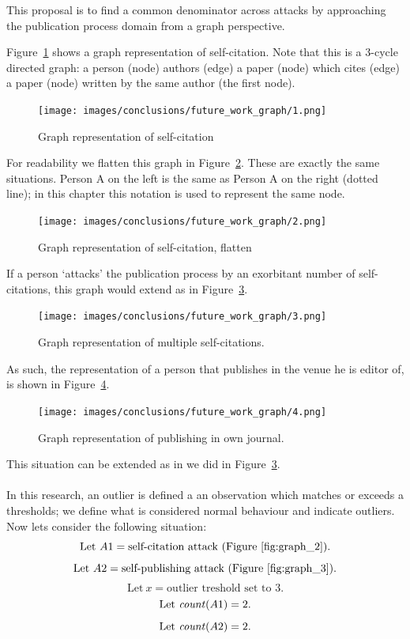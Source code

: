 \documentclass{ou-report}
\begin{document}
This proposal is to find a common denominator across attacks by approaching the 
publication process domain from a graph perspective.

Figure~\ref{fig:graph_1} shows a graph representation of self-citation.
Note that this is a 3-cycle directed graph: a person (node) authors (edge) a 
paper (node) which cites (edge) a paper (node) written by the same author (the 
first node).

\begin{figure}[H]
    \centering
    \texttt{[image: images/conclusions/future\_work\_graph/1.png]}
    \caption{Graph representation of self-citation}
    \label{fig:graph_1}
\end{figure}

For readability we flatten this graph in Figure~\ref{fig:graph_2}. These are 
exactly the same situations. Person A on the left is the same as Person A on
the right (dotted line); in this chapter this notation is used to represent
the same node.

\begin{figure}[H]
    \centering
    \texttt{[image: images/conclusions/future\_work\_graph/2.png]}
    \caption{Graph representation of self-citation, flatten}
    \label{fig:graph_2}
\end{figure}

If a person `attacks' the publication process by an exorbitant number of 
self-citations, this graph would extend as in Figure~\ref{fig:graph_3}.

\begin{figure}[H]
    \centering
    \texttt{[image: images/conclusions/future\_work\_graph/3.png]}
    \caption{Graph representation of multiple self-citations.}
    \label{fig:graph_3}
\end{figure}

As such, the representation of a person that publishes in the venue he is 
editor of, is shown in Figure~\ref{fig:graph_4}.

\begin{figure}[H]
    \centering
    \texttt{[image: images/conclusions/future\_work\_graph/4.png]}
    \caption{Graph representation of publishing in own journal.}
    \label{fig:graph_4}
\end{figure}

This situation can be extended as in we did in Figure~\ref{fig:graph_3}.


\newcommand{\ewcount}{\mi{count}}
\paragraph{}
In this research, an outlier is defined a an observation which matches or 
exceeds a thresholds; we define what is considered normal behaviour and 
indicate outliers. Now lets consider the following situation:
\[ \text{Let}\ A1=\text{self-citation attack (Figure~\ref{fig:graph_2})}. \] 
\[ \text{Let}\ A2=\text{self-publishing attack (Figure~\ref{fig:graph_3})}. \] 
\[ \text{Let}\ x=\text{outlier treshold set to 3}. \]
\[ \text{Let}\ \ewcount(A1)=2. \]
\[ \text{Let}\ \ewcount(A2)=2. \]
\end{document}
